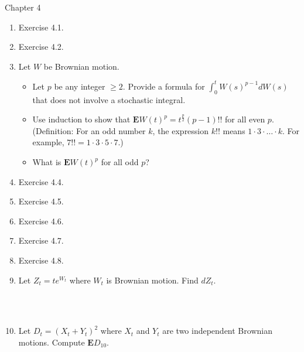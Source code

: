 \documentclass[12pt]{article}
\newcommand{\Ex}{\mathbf{E}}
\begin{document}
Chapter 4

\begin{enumerate}
  \item Exercise 4.1.
  \item Exercise 4.2.
  \item Let $W$ be Brownian motion.
  \begin{itemize}
    \item Let $p$ be any integer $\geq 2$. Provide a formula for $\int_0^t W(s)^{p-1} dW(s)$ that does not involve a stochastic integral.
    \item Use induction to show that $\Ex W(t)^p = t^{\frac{p}{2}} (p-1)!!$ for all even $p$. (Definition: For an odd number $k$, the expression $k!!$ means $1 \cdot 3 \cdot \ldots \cdot k$. For example, $7!! = 1 \cdot 3 \cdot 5 \cdot 7$.)
    \item What is $\Ex W(t)^p$ for all odd $p$?
  \end{itemize}
  \item Exercise 4.4.
  \item Exercise 4.5.
  \item Exercise 4.6.
  \item Exercise 4.7.
  \item Exercise 4.8.
  \item Let $Z_t = t e^{W_t}$ where $W_t$ is Brownian motion. Find $dZ_t$.
\begin{comment}
\\
\\
\textit{Solution}: By Ito's Lemma
\begin{align*}
dZ_t 	&= \{ e^{W_t} + 0 \cdot t e^{W_t} + \frac{1}{2} \cdot 1 \cdot t e^{W_t}\} dt + 1 \cdot t e^{W_t} dW_t\\
	&= \{e^{W_t} + \frac{1}{2}te^{W_t}\} dt + te^{W_t} dW_t
\end{align*}
\end{comment}
\\
\\
\item Let $D_t = (X_t + Y_t)^2$ where $X_t$ and $Y_t$ are two independent Brownian motions. Compute $\Ex D_{10}$.
\begin{comment}
\\
\\
\textit{Solution}: By Ito's Lemma
\begin{align*}
dD_t 	& = \{0 + 0 \cdot 2(X_t + Y_t) + 0 \cdot 2(X_t + Y_t) + \frac{1}{2} (1 \cdot 2 + 0 \cdot 2 + 0 \cdot 2 + 1 \cdot 2)\} dt\\
		& + 2(X_t + Y_t) dX_t + 2(X_t + Y_t) dY_t\\

\end{comment}
\end{enumerate}
\end{document}
